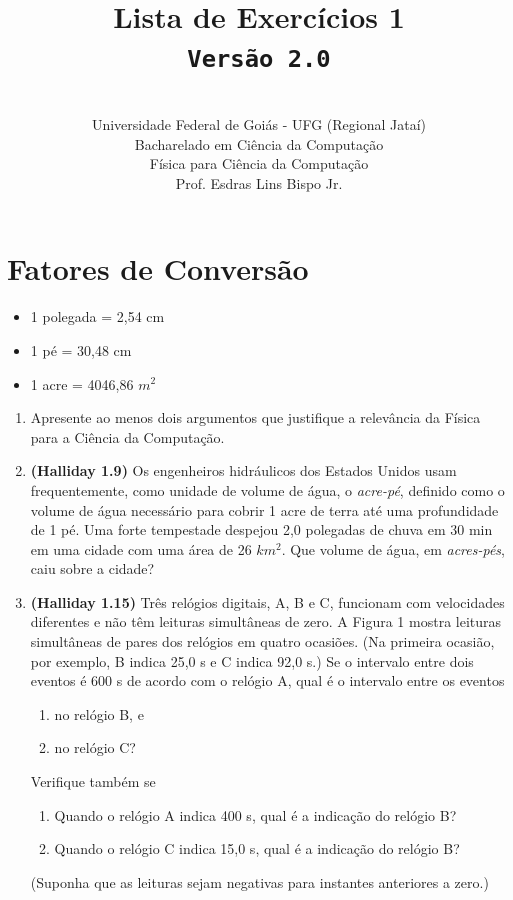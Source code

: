 \documentclass[12pt,a4paper,oneside]{article}
\author{\\Universidade Federal de Goiás - UFG (Regional Jataí) \\Bacharelado em Ciência da Computação \\Física para Ciência da Computação \\Prof. Esdras Lins Bispo Jr.}
\title{
	{\sc \huge Lista de Exercícios 1} 
	\\{\tt Versão 2.0}
}
\begin{document}
\maketitle


\section{Fatores de Conversão}
	\begin{itemize}
		\item 1 polegada = 2,54 cm
		\item 1 pé = 30,48 cm
		\item 1 acre = 4046,86 $m^2$
	\end{itemize}

\begin{enumerate}

\section{Conceitos}

	\item Apresente ao menos dois argumentos que justifique a relevância da Física para a Ciência da Computação.
	
	\item {\bf (Halliday 1.9)} Os engenheiros hidráulicos dos Estados Unidos usam frequentemente, como unidade de volume de água, o {\it acre-pé}, definido como o volume de água necessário para cobrir 1 acre de terra até uma profundidade de 1 pé. Uma forte tempestade despejou 2,0 polegadas de chuva em 30 min em uma cidade com uma área de 26 $km^2$. Que volume de água, em {\it acres-pés}, caiu sobre a cidade?
	
	\item {\bf (Halliday 1.15)} Três relógios digitais, A, B e C, funcionam com velocidades diferentes e não têm leituras simultâneas de zero. A Figura 1 mostra leituras simultâneas de pares dos relógios em quatro ocasiões. (Na primeira ocasião, por exemplo, B indica 25,0 s e C indica 92,0 s.) Se o intervalo entre dois eventos é 600 s de acordo com o relógio A, qual é o intervalo entre os eventos 
		\begin{enumerate}
			\item no relógio B, e
			\item no relógio C?
		\end{enumerate}
	Verifique também se
		\begin{enumerate}
			\item Quando o relógio A indica 400 s, qual é a indicação do relógio B?
			\item Quando o relógio C indica 15,0 s, qual é a indicação do relógio B?
		\end{enumerate}
	(Suponha que as leituras sejam negativas para instantes anteriores a zero.)
	

\end{enumerate}
\end{document}
